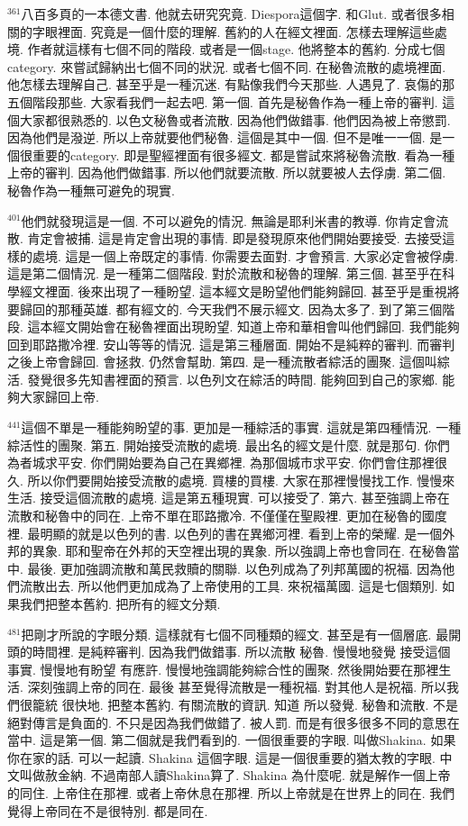 \documentclass{book}
\begin{document}
$^{361}$八百多頁的一本德文書.
他就去研究究竟.
Diespora這個字.
和Glut.
或者很多相關的字眼裡面.
究竟是一個什麼的理解.
舊約的人在經文裡面.
怎樣去理解這些處境.
作者就這樣有七個不同的階段.
或者是一個stage.
他將整本的舊約.
分成七個category.
來嘗試歸納出七個不同的狀況.
或者七個不同.
在秘魯流散的處境裡面.
他怎樣去理解自己.
甚至乎是一種沉迷.
有點像我們今天那些.
人遇見了.
哀傷的那五個階段那些.
大家看我們一起去吧.
第一個.
首先是秘魯作為一種上帝的審判.
這個大家都很熟悉的.
以色文秘魯或者流散.
因為他們做錯事.
他們因為被上帝懲罰.
因為他們是潑逆.
所以上帝就要他們秘魯.
這個是其中一個.
但不是唯一一個.
是一個很重要的category.
即是聖經裡面有很多經文.
都是嘗試來將秘魯流散.
看為一種上帝的審判.
因為他們做錯事.
所以他們就要流散.
所以就要被人去俘虜.
第二個.
秘魯作為一種無可避免的現實.

$^{401}$他們就發現這是一個.
不可以避免的情況.
無論是耶利米書的教導.
你肯定會流散.
肯定會被捕.
這是肯定會出現的事情.
即是發現原來他們開始要接受.
去接受這樣的處境.
這是一個上帝既定的事情.
你需要去面對.
才會預言.
大家必定會被俘虜.
這是第二個情況.
是一種第二個階段.
對於流散和秘魯的理解.
第三個.
甚至乎在科學經文裡面.
後來出現了一種盼望.
這本經文是盼望他們能夠歸回.
甚至乎是重視將要歸回的那種英雄.
都有經文的.
今天我們不展示經文.
因為太多了.
到了第三個階段.
這本經文開始會在秘魯裡面出現盼望.
知道上帝和華相會叫他們歸回.
我們能夠回到耶路撒冷裡.
安山等等的情況.
這是第三種層面.
開始不是純粹的審判.
而審判之後上帝會歸回.
會拯救.
仍然會幫助.
第四.
是一種流散者綜活的團聚.
這個叫綜活.
發覺很多先知書裡面的預言.
以色列文在綜活的時間.
能夠回到自己的家鄉.
能夠大家歸回上帝.

$^{441}$這個不單是一種能夠盼望的事.
更加是一種綜活的事實.
這就是第四種情況.
一種綜活性的團聚.
第五.
開始接受流散的處境.
最出名的經文是什麼.
就是那句.
你們為者城求平安.
你們開始要為自己在異鄉裡.
為那個城市求平安.
你們會住那裡很久.
所以你們要開始接受流散的處境.
買樓的買樓.
大家在那裡慢慢找工作.
慢慢來生活.
接受這個流散的處境.
這是第五種現實.
可以接受了.
第六.
甚至強調上帝在流散和秘魯中的同在.
上帝不單在耶路撒冷.
不僅僅在聖殿裡.
更加在秘魯的國度裡.
最明顯的就是以色列的書.
以色列的書在異鄉河裡.
看到上帝的榮耀.
是一個外邦的異象.
耶和聖帝在外邦的天空裡出現的異象.
所以強調上帝也會同在.
在秘魯當中.
最後.
更加強調流散和萬民救贖的關聯.
以色列成為了列邦萬國的祝福.
因為他們流散出去.
所以他們更加成為了上帝使用的工具.
來祝福萬國.
這是七個類別.
如果我們把整本舊約.
把所有的經文分類.

$^{481}$把剛才所說的字眼分類.
這樣就有七個不同種類的經文.
甚至是有一個層底.
最開頭的時間裡.
是純粹審判.
因為我們做錯事.
所以流散 秘魯.
慢慢地發覺 接受這個事實.
慢慢地有盼望 有應許.
慢慢地強調能夠綜合性的團聚.
然後開始要在那裡生活.
深刻強調上帝的同在.
最後 甚至覺得流散是一種祝福.
對其他人是祝福.
所以我們很籠統 很快地.
把整本舊約.
有關流散的資訊.
知道 所以發覺.
秘魯和流散.
不是絕對傳言是負面的.
不只是因為我們做錯了.
被人罰.
而是有很多很多不同的意思在當中.
這是第一個.
第二個就是我們看到的.
一個很重要的字眼.
叫做Shakina.
如果你在家的話.
可以一起讀.
Shakina 這個字眼.
這是一個很重要的猶太教的字眼.
中文叫做赦金納.
不過南部人讀Shakina算了.
Shakina 為什麼呢.
就是解作一個上帝的同住.
上帝住在那裡.
或者上帝休息在那裡.
所以上帝就是在世界上的同在.
我們覺得上帝同在不是很特別.
都是同在.
\end{document}
